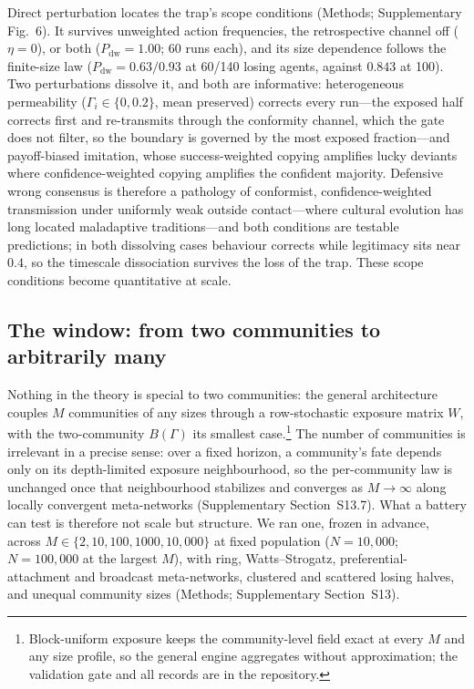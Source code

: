 \documentclass[11pt]{article}
\newcommand{\1}{\mathbf{1}}
\begin{document}
Direct perturbation locates the trap's scope conditions (Methods; Supplementary Fig.~6). It survives unweighted action frequencies, the retrospective channel off ($\eta=0$), or both ($P_{\mathrm{dw}}=1.00$; 60 runs each), and its size dependence follows the finite-size law ($P_{\mathrm{dw}}=0.63/0.93$ at 60/140 losing agents, against $0.843$ at 100). Two perturbations dissolve it, and both are informative: heterogeneous permeability ($\Gamma_i\in\{0,0.2\}$, mean preserved) corrects every run---the exposed half corrects first and re-transmits through the conformity channel, which the gate does not filter, so the boundary is governed by the most exposed fraction---and payoff-biased imitation, whose success-weighted copying amplifies lucky deviants where confidence-weighted copying amplifies the confident majority. Defensive wrong consensus is therefore a pathology of conformist, confidence-weighted transmission under uniformly weak outside contact---where cultural evolution has long located maladaptive traditions\cite{BoydRicherson1985}---and both conditions are testable predictions; in both dissolving cases behaviour corrects while legitimacy sits near $0.4$, so the timescale dissociation survives the loss of the trap. These scope conditions become quantitative at scale.

\subsection{The window: from two communities to arbitrarily many}

Nothing in the theory is special to two communities: the general architecture couples $M$ communities of any sizes through a row-stochastic exposure matrix $W$, with the two-community $B(\Gamma)$ its smallest case.\footnote{Block-uniform exposure keeps the community-level field exact at every $M$ and any size profile, so the general engine aggregates without approximation; the validation gate and all records are in the repository.} The number of communities is irrelevant in a precise sense: over a fixed horizon, a community's fate depends only on its depth-limited exposure neighbourhood, so the per-community law is unchanged once that neighbourhood stabilizes and converges as $M\to\infty$ along locally convergent meta-networks (Supplementary Section~S13.7). What a battery can test is therefore not scale but structure. We ran one, frozen in advance, across $M\in\{2,10,100,1000,10{,}000\}$ at fixed population ($N=10{,}000$; $N=100{,}000$ at the largest $M$), with ring, Watts--Strogatz, preferential-attachment and broadcast meta-networks, clustered and scattered losing halves, and unequal community sizes (Methods; Supplementary Section~S13).
\end{document}
